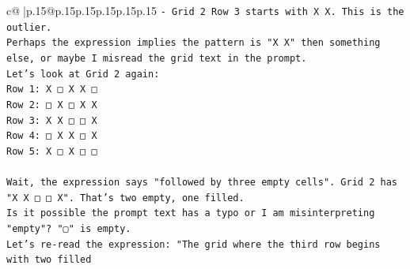 \documentclass{article}
\begin{document}
{\begin{supertabular}{c@{$\;$}|p{.15\linewidth}@{}p{.15\linewidth}p{.15\linewidth}p{.15\linewidth}p{.15\linewidth}p{.15\linewidth}}
{{{\texttt{{-} Grid 2 Row 3 starts with X X. This is the outlier.} \\
\texttt{Perhaps the expression implies the pattern is "X X" then something else, or maybe I misread the grid text in the prompt.} \\
\texttt{Let's look at Grid 2 again:} \\
\texttt{Row 1: X □ X X □} \\
\texttt{Row 2: □ X □ X X} \\
\texttt{Row 3: X X □ □ X} \\
\texttt{Row 4: □ X X □ X} \\
\texttt{Row 5: X □ X □ □} \\
\\ 
\texttt{Wait, the expression says "followed by three empty cells". Grid 2 has "X X □ □ X". That's two empty, one filled.} \\
\texttt{Is it possible the prompt text has a typo or I am misinterpreting "empty"? "▢" is empty.} \\
\texttt{Let's re{-}read the expression: "The grid where the third row begins with two filled} \\
            }
        }
    }
     \\ \\

\end{supertabular}
}
\end{document}
